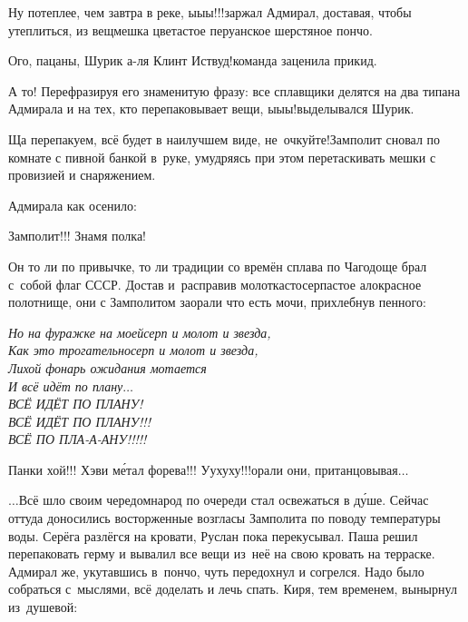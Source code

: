 \diagdash Ну потеплее, чем завтра в реке, ы\sdash ы\sdash ы!!!\mdash заржал Адмирал, доставая, чтобы утеплиться, из вещмешка цветастое перуанское шерстяное пончо.

\diagdash Ого, пацаны, Шурик а-ля Клинт Иствуд!\mdash команда заценила прикид.

\diagdash А то! Перефразируя его знаменитую фразу: все сплавщики делятся на два типа\mdash на Адмирала и на тех, кто перепаковывает вещи, ы\sdash ы\sdash ы!\mdash выделывался Шурик.

\diagdash Ща перепакуем, всё будет в наилучшем виде, не~очкуйте!\mdash Замполит сновал по комнате с пивной банкой в~руке, умудряясь при этом перетаскивать мешки с провизией и снаряжением.

Адмирала как осенило:

\diagdash Замполит!!! Знамя полка!

Он то ли по привычке, то ли традиции со времён сплава по Чагодоще брал с~собой флаг СССР. Достав и~расправив молоткасто\sdash серпастое ало\sdash красное полотнище, они с Замполитом заорали что есть мочи, прихлебнув пенного:

\vspace{0.2cm}
\noindent\textit{%
	\hspace*{1.2cm}Но на фуражке на моей\mdash серп и молот и звезда,\\
	\hspace*{1.2cm}Как это трогательно\mdash серп и молот и звезда,\\
	\hspace*{1.2cm}Лихой фонарь ожидания мотается\\
	\hspace*{1.2cm}И всё идёт по плану$\ldots$\\
	\hspace*{1.2cm}\large{ВСЁ ИДЁТ ПО ПЛАНУ!}\\
	\hspace*{1.2cm}\Large{ВСЁ ИДЁТ ПО ПЛАНУ!!!}\\
	\hspace*{1.2cm}\LARGE{ВСЁ ПО ПЛА-А-АНУ!!!!!}
}

\vspace{0.2cm}
\diagdash Панки хой!!! Хэви м\'{е}тал форева!!! У\sdash у\sdash х\sdash у\sdash х\sdash у!!!\mdash орали они, пританцовывая$\ldots$

\vspace{0.5cm}
$\ldots$Всё шло своим чередом\mdash народ по очереди стал освежаться в д\'{у}ше. Сейчас оттуда доносились восторженные возгласы Замполита по поводу температуры воды. Серёга разлёгся на кровати, Руслан пока перекусывал. Паша решил перепаковать герму и вывалил все вещи из~неё на свою кровать на терраске. Адмирал же, укутавшись в~пончо, чуть передохнул и согрелся. Надо было собраться с~мыслями, всё доделать и лечь спать. Киря, тем временем, вынырнул из~душевой:

